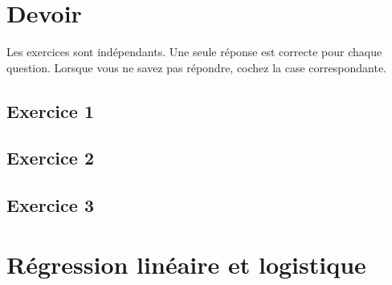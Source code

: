 \chapter*{Devoir }

Les exercices sont indépendants. Une seule réponse est correcte pour chaque
question. Lorsque vous ne savez pas répondre, cochez la case correspondante.

\section*{Exercice 1}

\section*{Exercice 2}

\section*{Exercice 3}

\chapter{Régression linéaire et logistique}

